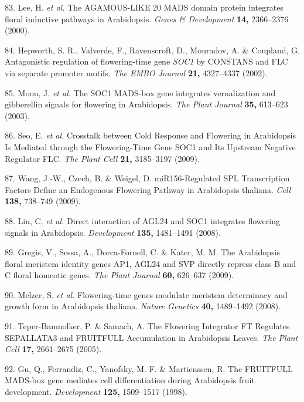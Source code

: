 \documentclass[12pt,]{book}
\begin{document}
\hypertarget{ref-lee_agamous_like_2000}{}
83. Lee, H. \emph{et al.} The AGAMOUS-LIKE 20 MADS domain protein
integrates floral inductive pathways in Arabidopsis. \emph{Genes \&
Development} \textbf{14,} 2366--2376 (2000).

\hypertarget{ref-hepworth_antagonistic_2002}{}
84. Hepworth, S. R., Valverde, F., Ravenscroft, D., Mouradov, A. \&
Coupland, G. Antagonistic regulation of flowering-time gene \emph{SOC1}
by CONSTANS and FLC via separate promoter motifs. \emph{The EMBO
Journal} \textbf{21,} 4327--4337 (2002).

\hypertarget{ref-moon_soc1_2003}{}
85. Moon, J. \emph{et al.} The SOC1 MADS-box gene integrates
vernalization and gibberellin signals for flowering in Arabidopsis.
\emph{The Plant Journal} \textbf{35,} 613--623 (2003).

\hypertarget{ref-seo_crosstalk_2009}{}
86. Seo, E. \emph{et al.} Crosstalk between Cold Response and Flowering
in Arabidopsis Is Mediated through the Flowering-Time Gene SOC1 and Its
Upstream Negative Regulator FLC. \emph{The Plant Cell} \textbf{21,}
3185--3197 (2009).

\hypertarget{ref-wang_mir156_2009}{}
87. Wang, J.-W., Czech, B. \& Weigel, D. miR156-Regulated SPL
Transcription Factors Define an Endogenous Flowering Pathway in
Arabidopsis thaliana. \emph{Cell} \textbf{138,} 738--749 (2009).

\hypertarget{ref-liu_direct_2008}{}
88. Liu, C. \emph{et al.} Direct interaction of AGL24 and SOC1
integrates flowering signals in Arabidopsis. \emph{Development}
\textbf{135,} 1481--1491 (2008).

\hypertarget{ref-gregis_arabidopsis_2009}{}
89. Gregis, V., Sessa, A., Dorca-Fornell, C. \& Kater, M. M. The
Arabidopsis floral meristem identity genes AP1, AGL24 and SVP directly
repress class B and C floral homeotic genes. \emph{The Plant Journal}
\textbf{60,} 626--637 (2009).

\hypertarget{ref-melzer_flowering_time_2008}{}
90. Melzer, S. \emph{et al.} Flowering-time genes modulate meristem
determinacy and growth form in Arabidopsis thaliana. \emph{Nature
Genetics} \textbf{40,} 1489--1492 (2008).

\hypertarget{ref-teper_bamnolker_flowering_2005}{}
91. Teper-Bamnolker, P. \& Samach, A. The Flowering Integrator FT
Regulates SEPALLATA3 and FRUITFULL Accumulation in Arabidopsis Leaves.
\emph{The Plant Cell} \textbf{17,} 2661--2675 (2005).

\hypertarget{ref-gu_fruitfull_1998}{}
92. Gu, Q., Ferrandiz, C., Yanofsky, M. F. \& Martienssen, R. The
FRUITFULL MADS-box gene mediates cell differentiation during Arabidopsis
fruit development. \emph{Development} \textbf{125,} 1509--1517 (1998).
\end{document}
